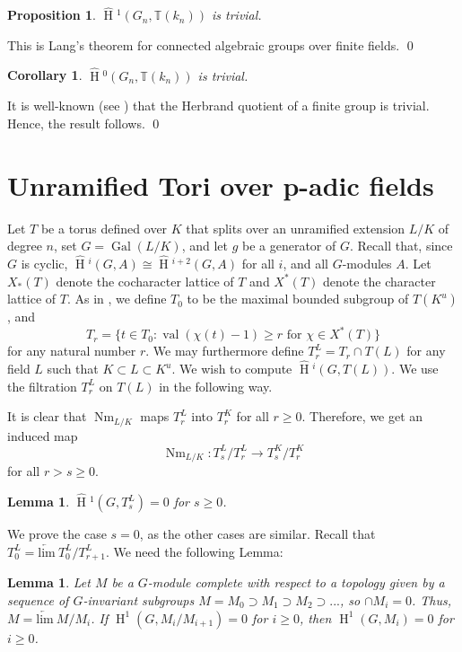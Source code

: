 \documentclass[11pt]{amsart}
\theoremstyle{plain}
\newtheorem{proposition}[theorem]{Proposition}
\newtheorem{corollary}[theorem]{Corollary}
\newtheorem{lemma}[theorem]{Lemma}
\newcommand{\HT}[1]{\hat{\HH}{}^{#1}}
\theoremstyle{definition}
\DeclareMathOperator{\Gal}{Gal}
\DeclareMathOperator{\val}{val}
\DeclareMathOperator{\HH}{H}
\DeclareMathOperator{\Nm}{Nm}
\begin{document}
\begin{proposition}\label{trivialH1finitefields}
$\HT{1}(G_n,\mathbb{T}(k_n))$ is trivial.
\end{proposition}

\proof
This is Lang's theorem for connected algebraic groups over finite fields.
\qed

\begin{corollary}
$\HT{0}(G_n,\mathbb{T}(k_n))$ is trivial.
\end{corollary}

\proof
It is well-known (see \cite[p. 134]{serre}) that the Herbrand quotient
of a finite group is trivial.  Hence, the result follows.
\qed

\section{Unramified Tori over p-adic fields}

Let $T$ be a torus defined over $K$ that splits over an unramified
extension $L/K$ of degree $n$, set $G = \Gal(L/K)$, and let $g$ be a
generator of $G$.  Recall that, since $G$ is cyclic,
$\HT{i}(G,A)\cong \HT{i+2}(G,A)$ for all $i$, and all
$G$-modules $A$.  Let $X_*(T)$ denote the cocharacter lattice of $T$ and
$X^*(T)$ denote the character lattice of $T$.  As in \cite[Section 3]{moyprasad1},
we define $T_0$ to be the maximal bounded subgroup of
$T(K^u)$, and
$$T_r = \{t \in T_0 : \val(\chi(t) - 1) \geq r \mbox{ for } \chi \in X^*(T) \}$$
for any natural number $r$.  We may
furthermore define $T_r^L = T_r \cap T(L)$ for any field $L$ such
that $K \subset L \subset K^u$.  We wish to compute $\HT{i}(G, T(L))$.
We use the filtration $T_r^L$ on $T(L)$ in the following way.

It is clear that $\Nm_{L/K}$ maps $T_r^L$ into $T_r^K$ for all $r \geq 0$.
Therefore, we get an induced map
$$\Nm_{L/K} : T_s^L / T_{r}^L \rightarrow T_s^K / T_{r}^K$$
for all $r > s \geq 0$.

\begin{lemma}\label{H1compactpart}
$\HT{1}(G, T_{s}^L) = 0$ for $s \geq 0$.
\end{lemma}

\proof
We prove the case $s = 0$, as the other cases are similar.  Recall
that $T_0^L = \underleftarrow{\mathrm{lim}} \ T_0^L / T_{r+1}^L$.  We
need the following Lemma:

\begin{lemma}\label{abstractcohomology}
  Let $M$ be a $G$-module complete with respect to a topology given by
  a sequence of $G$-invariant subgroups $M = M_0 \supset M_1 \supset
  M_2 \supset ...$, so $\cap M_i = 0$.  Thus,
  $M = \underleftarrow{\mathrm{lim}} \ M / M_i$.
  If $\HH^1(G, M_i / M_{i+1}) = 0$ for $i \geq 0$,
  then $\HH^1(G, M_i) = 0$ for $i \geq 0$.
\end{lemma}
\end{document}

